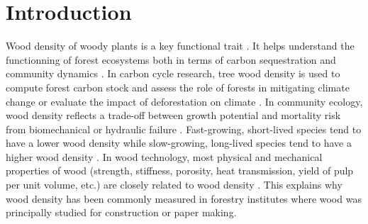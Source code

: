 \documentclass[a4paper, 12pt, leqno, dvipsnames]{article}\usepackage[]{graphicx}\usepackage[]{color}
\begin{document}
\newpage
\doublespacing

\section{Introduction}


Wood density of woody plants is a key functional trait \citep{Violle2007, Chave2009}. It helps understand the functionning of forest ecosystems both in terms of carbon sequestration \citep{Chave2005, Vieilledent2012} and community dynamics \citep{Westoby2006, Kunstler2016, Diaz2016}. In carbon cycle research, tree wood density is used to compute forest carbon stock and assess the role of forests in mitigating climate change \citep{Pan2011, Vieilledent2016} or evaluate the impact of deforestation on climate \citep{Achard2014}. In community ecology, wood density reflects a trade-off between growth potential and mortality risk from biomechanical or hydraulic failure \citep{Diaz2016}. Fast-growing, short-lived species tend to have a lower wood density while slow-growing, long-lived species tend to have a higher wood density \citep{Chave2009, Greenwood2017}. In wood technology, most physical and mechanical properties of wood (strength, stiffness, porosity, heat transmission, yield of pulp per unit volume, etc.) are closely related to wood density \citep{Sallenave1955, Thibaut2001, Shmulsky2011}. This explains why wood density has been commonly measured in forestry institutes where wood was principally studied for construction or paper making.

\end{document}
